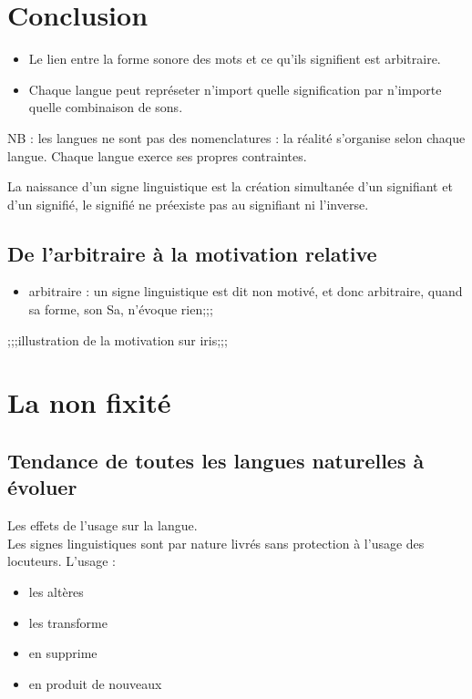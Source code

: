 \section{Conclusion}
\begin{itemize}
         \item Le lien entre la forme sonore des mots et ce qu'ils signifient est arbitraire.
         \item Chaque langue peut représeter n'import quelle signification par n'importe quelle combinaison de sons.
\end{itemize}

NB : les langues ne sont pas des nomenclatures : la réalité s'organise selon chaque langue. Chaque langue exerce ses propres contraintes.

La naissance d'un signe linguistique est la création simultanée d'un signifiant et d'un signifié, le signifié ne préexiste pas au signifiant ni l'inverse.

\subsection{De l'arbitraire à la motivation relative}

\begin{def}
   \begin{itemize} 
            \item arbitraire : un signe linguistique est dit non motivé, et donc arbitraire, quand sa forme, son Sa, n'évoque rien;;;
   \end{itemize}
\end{def}

;;;illustration de la motivation sur iris;;;

\section{La non fixité}
\subsection{Tendance de toutes les langues naturelles à évoluer}
Les effets de l'usage sur la langue.\\

Les signes linguistiques sont par nature livrés sans protection à l'usage des locuteurs. L'usage :
\begin{itemize}
         \item les altères 
         \item les transforme
         \item en supprime 
         \item en produit de nouveaux
\end{itemize}

